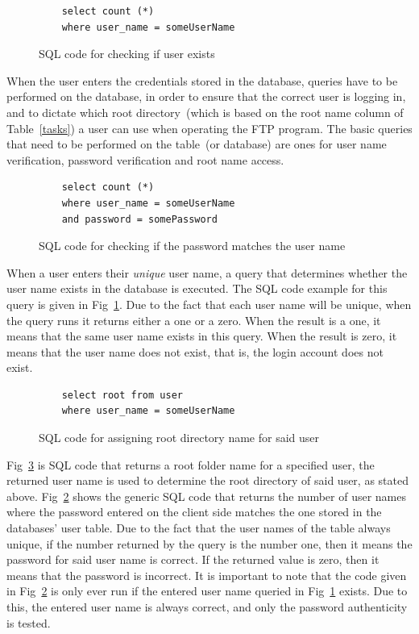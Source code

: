 \documentclass[journal, a4paper]{IEEEtran}
\begin{document}
\begin{figure}[hbtp]
	\begin{lstlisting}
	select count (*) 
	where user_name = someUserName
	\end{lstlisting}
	\caption{SQL code for checking if user exists}
	\label {sqluser}
\end{figure}

When the user enters the credentials stored in the database,  queries have to be performed on the database, in order to ensure that the correct user is logging in, and to dictate which root directory~(which is based on the root name column of Table~\ref{tasks}) a user can use when operating the FTP program. The basic queries that need to be performed on the table~(or database) are ones for user name verification, password verification and root name access.

\begin{figure}[hbtp]
	\begin{lstlisting}
	select count (*) 
	where user_name = someUserName
	and password = somePassword
	\end{lstlisting}
	\caption{SQL code for checking if the password matches the user name}
	\label {sqlpass}
\end{figure}

When a user enters their \textit{unique} user name, a query that determines whether the user name exists in the database is executed. The SQL code example for this query is given in Fig~\ref{sqluser}. Due to the fact that each user name will be unique, when the query runs it returns either a one or a zero. When the result is a one, it means that the same user name exists in this query. When the result is zero, it means that the user name does not exist, that is, the login account does not exist.

\begin{figure}[hbtp]
	\begin{lstlisting}
	select root from user
	where user_name = someUserName
	\end{lstlisting}
	\caption{SQL code for assigning root directory name for said user}
	\label {sqlroot}
\end{figure}

Fig~\ref{sqlroot} is SQL code that returns a root folder name  for a specified user, the returned user name is used to determine the root directory of said user, as stated above. Fig~\ref{sqlpass} shows the generic SQL code that returns the number of user names where the password entered on the client side matches the one stored in the databases' user table. Due to the fact that the user names of the table always unique, if the number returned by the query is the number one, then it means the password for said user name is correct. If the returned value is zero, then it means that the password is incorrect. It is important to note that the code given in Fig~\ref{sqlpass} is only ever run if the entered user name queried in Fig~\ref{sqluser} exists. Due to this, the entered user name is always correct, and only the password authenticity is tested.
\end{document}
